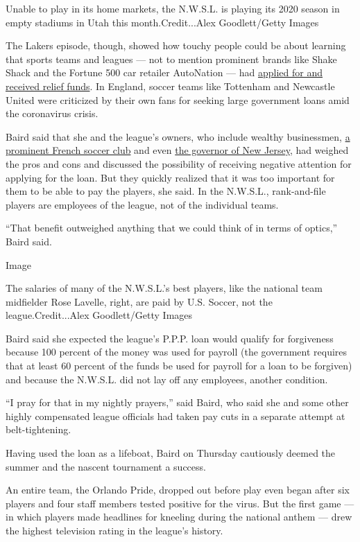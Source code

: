 Unable to play in its home markets, the N.W.S.L. is playing its 2020
season in empty stadiums in Utah this month.Credit...Alex Goodlett/Getty
Images

The Lakers episode, though, showed how touchy people could be about
learning that sports teams and leagues --- not to mention prominent
brands like Shake Shack and the Fortune 500 car retailer AutoNation ---
had
\href{https://www.nytimes3xbfgragh.onion/2020/04/28/us/politics/coronavirus-treasury-payment-protection-program.html}{applied
for and received relief funds}. In England, soccer teams like Tottenham
and Newcastle United were criticized by their own fans for seeking large
government loans amid the coronavirus crisis.

Baird said that she and the league's owners, who include wealthy
businessmen,
\href{https://www.reuters.com/article/us-soccer-women-nwsl/lyon-parent-company-acquires-nwsls-reign-fc-idUSKBN1YO002}{a
prominent French soccer club} and even
\href{https://skybluefc.com/ownership/}{the governor of New Jersey}, had
weighed the pros and cons and discussed the possibility of receiving
negative attention for applying for the loan. But they quickly realized
that it was too important for them to be able to pay the players, she
said. In the N.W.S.L., rank-and-file players are employees of the
league, not of the individual teams.

``That benefit outweighed anything that we could think of in terms of
optics,'' Baird said.

Image

The salaries of many of the N.W.S.L.'s best players, like the national
team midfielder Rose Lavelle, right, are paid by U.S. Soccer, not the
league.Credit...Alex Goodlett/Getty Images

Baird said she expected the league's P.P.P. loan would qualify for
forgiveness because 100 percent of the money was used for payroll (the
government requires that at least 60 percent of the funds be used for
payroll for a loan to be forgiven) and because the N.W.S.L. did not lay
off any employees, another condition.

``I pray for that in my nightly prayers,'' said Baird, who said she and
some other highly compensated league officials had taken pay cuts in a
separate attempt at belt-tightening.

Having used the loan as a lifeboat, Baird on Thursday cautiously deemed
the summer and the nascent tournament a success.

An entire team, the Orlando Pride, dropped out before play even began
after six players and four staff members tested positive for the virus.
But the first game --- in which players made headlines for kneeling
during the national anthem --- drew the highest television rating in the
league's history.

